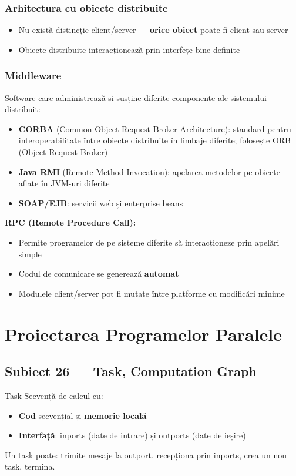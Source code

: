 \documentclass[a4paper,11pt]{article}
\newcommand{\subiect}[2]{\subsection{Subiect \textcolor{numcol}{#1} — #2}}
\begin{document}
\subsubsection{Arhitectura cu obiecte distribuite}
\begin{itemize}[noitemsep]
  \item Nu există distincție client/server — \textbf{orice obiect} poate fi client sau server
  \item Obiecte distribuite interacționează prin interfețe bine definite
\end{itemize}

\subsubsection{Middleware}
Software care administrează și susține diferite componente ale sistemului distribuit:
\begin{itemize}[noitemsep]
  \item \textbf{CORBA} (Common Object Request Broker Architecture): standard pentru interoperabilitate între obiecte distribuite în limbaje diferite; folosește ORB (Object Request Broker)
  \item \textbf{Java RMI} (Remote Method Invocation): apelarea metodelor pe obiecte aflate în JVM-uri diferite
  \item \textbf{SOAP/EJB}: servicii web și enterprise beans
\end{itemize}

\textbf{RPC (Remote Procedure Call):}
\begin{itemize}[noitemsep]
  \item Permite programelor de pe sisteme diferite să interacționeze prin apelări simple
  \item Codul de comunicare se generează \textbf{automat}
  \item Modulele client/server pot fi mutate între platforme cu modificări minime
\end{itemize}

\section{Proiectarea Programelor Paralele}

\subiect{26}{Task, Computation Graph}

\begin{defbox}{Task}
Secvență de calcul cu:
\begin{itemize}[noitemsep]
  \item \textbf{Cod} secvențial și \textbf{memorie locală}
  \item \textbf{Interfață}: inports (date de intrare) și outports (date de ieșire)
\end{itemize}
Un task poate: trimite mesaje la outport, recepționa prin inports, crea un nou task, termina.
\end{defbox}
\end{document}
